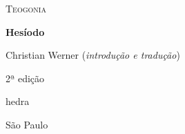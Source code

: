 




\begingroup\thispagestyle{empty}\vspace*{.05\textheight} 

              \formular
              \LARGE
              \noindent
              \textsc{Teogonia}
                      
              \bigskip  
              
              \Large
              \noindent
              \textbf{Hesíodo}
              \vspace{3.5em}

              \newfontfamily{}
              {\fontsize{30}{40}\selectfont \minion\small\noindent Christian Werner (\textit{introdução e tradução})}\\
              \vspace{3em}

              \noindent
              {\fontsize{30}{40}\selectfont \minion\small\noindent 2ª edição}

              \vfill

              \newfontfamily{}
              {\noindent\fontsize{30}{40}\selectfont \timesnewroman hedra}
              \smallskip

              {\selectfont\minion\small
              \noindent São Paulo \quad\the\year}

\endgroup
\pagebreak

